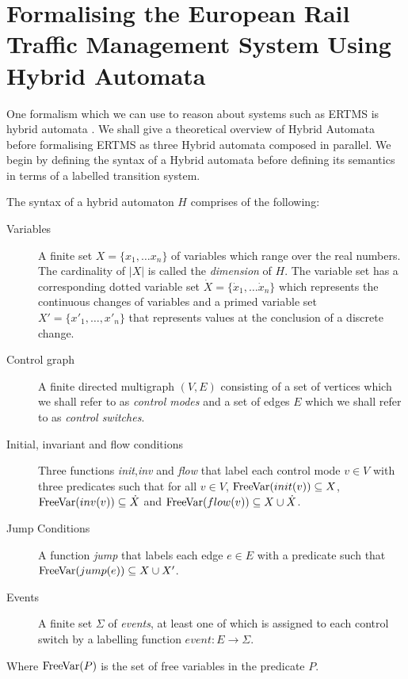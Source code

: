\section{Formalising the European Rail Traffic Management System Using Hybrid Automata}
One formalism which we can use to reason about systems such as ERTMS is hybrid automata \cite{TH96}. We shall give a theoretical overview of Hybrid Automata before formalising ERTMS as three Hybrid automata composed in parallel.
We begin by defining the syntax of a Hybrid automata before defining its semantics in terms of a labelled transition system.
\medskip
\begin{mydef}
The syntax of a hybrid automaton $H$ comprises of the following:
\begin{description}
\item[Variables] A finite set $X = \{x_1, \ldots x_n \}$ of variables which range over the real numbers. The cardinality of $|X|$ is called the \emph{dimension} of $H$. The variable set has a corresponding dotted variable set $\dot{X} = \{\dot{x}_1, \ldots \dot{x}_n \}$ which represents the continuous changes of variables and a primed variable set $X' = \{x'_1, \ldots , x'_n \}$ that represents  values at the conclusion of a discrete change.

\item[Control graph] A finite directed multigraph $(V,E)$ consisting of a set of vertices which we shall refer to as \emph{control modes} and a set of edges $E$ which we shall refer to as \emph{control switches}.

\item[Initial, invariant and flow conditions] Three functions \emph{init},\emph{inv} and \emph{flow} that label each control mode $v \in V$ with three predicates such that for all $v \in V$, $\mathrm{FreeVar}(init(v)) \subseteq X$, $\mathrm{FreeVar}(inv(v)) \subseteq \dot{X}$ and $\mathrm{FreeVar}(flow(v)) \subseteq X \cup \dot{X}$. 


\item[Jump Conditions] A function \emph{jump} that labels each edge $e \in E$ with a predicate such that $\mathrm{FreeVar}(jump(e)) \subseteq X \cup X' $.

\item[Events] A finite set $\Sigma$ of \emph{events}, at least one of which is assigned to  each control switch by a labelling function $event: E \to \Sigma$.

\end{description}
Where $\mathrm{FreeVar}(P)$ is the set of free variables in the predicate $P$.
\end{mydef}
